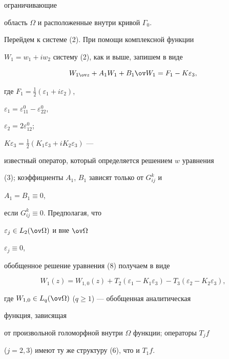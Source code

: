 ограничивающие  


область $\Omega$ и расположенные внутри кривой $\Gamma_0$. 


 


Перейдем к системе (2). При помощи комплексной функции 


$W_1=w_1+iw_2$ систему (2), как и выше, запишем в виде 


\begin{equation} 


W_{1\ov z}+A_1W_1+B_1\ov W_1=F_1-K\varepsilon_3, 


\end{equation} 


где $F_1=\frac{1}{2}(\varepsilon_1+i\varepsilon_2)$, 


$\varepsilon_1=\varepsilon^0_{11}-\varepsilon^0_{22}$, 


$\varepsilon_2=2\varepsilon^0_{12}$; 


$K\varepsilon_3=\frac{1}{2}(K_1\varepsilon_3+iK_2\varepsilon_3)$ --- 


известный оператор, который определяется решением $w$ уравнения 


(3); коэффициенты $A_1$, $B_1$ зависят только от $G^k_{ij}$ и 


$A_1=B_1\equiv 0$, 


если $G^k_{ij}\equiv 0$. Предполагая, что 


$\varepsilon_j\in L_2(\ov\Omega)$ и вне $\ov\Omega$\; 


$\varepsilon_j\equiv 0$,


обобщенное решение уравнения (8) получаем в виде 


\begin{equation} 


W_1(z)=W_{1,0}(z)+T_2(\varepsilon_1-K_1\varepsilon_3)- 


T_3(\varepsilon_2-K_2\varepsilon_3), 


\end{equation} 


где $W_{1,0}\in L_q(\ov\Omega)$ ($q\ge 1$) --- обобщенная аналитическая 


функция, зависящая 


от произвольной голоморфной внутри $\Omega$ функции; операторы $T_jf$ 


($j=2,3$) имеют ту же структуру (6), что и $T_1f$. 


 



